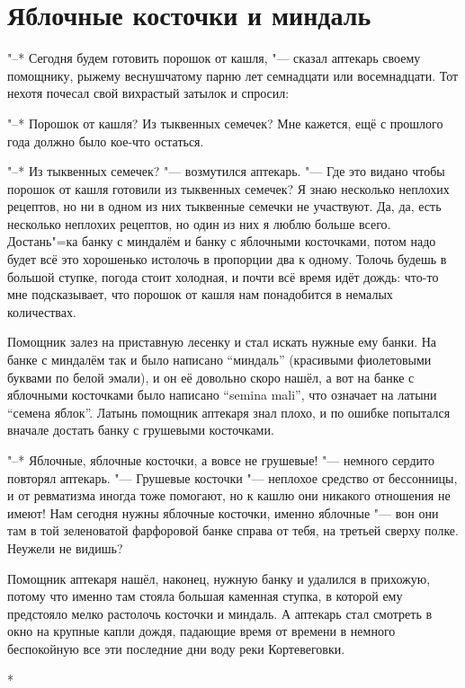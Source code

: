 \section{Яблочные косточки и миндаль}

"--* Сегодня будем готовить порошок от кашля, "--- сказал аптекарь своему
помощнику, рыжему веснушчатому парню лет семнадцати или восемнадцати.
Тот нехотя почесал свой вихрастый затылок и спросил:

"--* Порошок от кашля?
Из тыквенных семечек?
Мне кажется, ещё с прошлого года должно было кое-что остаться.

"--* Из тыквенных семечек? "--- возмутился аптекарь.
"--- Где это видано чтобы порошок от кашля готовили из тыквенных семечек?
Я знаю несколько неплохих рецептов, но ни в одном из них тыквенные семечки не
участвуют.
Да, да, есть несколько неплохих рецептов, но один из них я люблю больше всего.
Достань"=ка банку с миндалём и банку с яблочными косточками, потом надо будет
всё это хорошенько истолочь в пропорции два к одному.
Толочь будешь в большой ступке, погода стоит холодная, и почти всё время идёт
дождь: что-то мне подсказывает, что порошок от кашля нам понадобится в немалых
количествах.

Помощник залез на приставную лесенку и стал искать нужные ему банки.
На банке с миндалём так и было написано \enquote{миндаль} (красивыми фиолетовыми
буквами по белой эмали), и он её довольно скоро нашёл, а вот на банке с
яблочными косточками было написано
\enquote{\foreignlanguage{latin}{semina mali}},
что означает на латыни \enquote{семена яблок}.
Латынь помощник аптекаря знал плохо, и по ошибке попытался вначале достать банку
с грушевыми косточками.

"--* Яблочные, яблочные косточки, а вовсе не грушевые! "--- немного сердито
повторял аптекарь.
"--- Грушевые косточки "--- неплохое средство от бессонницы, и от ревматизма
иногда тоже помогают, но к кашлю они никакого отношения не имеют!
Нам сегодня нужны яблочные косточки, именно яблочные "--- вон они там в той
зеленоватой фарфоровой банке справа от тебя, на третьей сверху полке.
Неужели не видишь?

Помощник аптекаря нашёл, наконец, нужную банку и удалился в прихожую, потому что
именно там стояла большая каменная ступка, в которой ему предстояло мелко
растолочь косточки и миндаль.
А аптекарь стал смотреть в окно на крупные капли дождя, падающие время от
времени в немного беспокойную все эти последние дни воду реки Кортевеговки.

\medskip
\begin{center}
*\quad*\quad*
\end{center}

